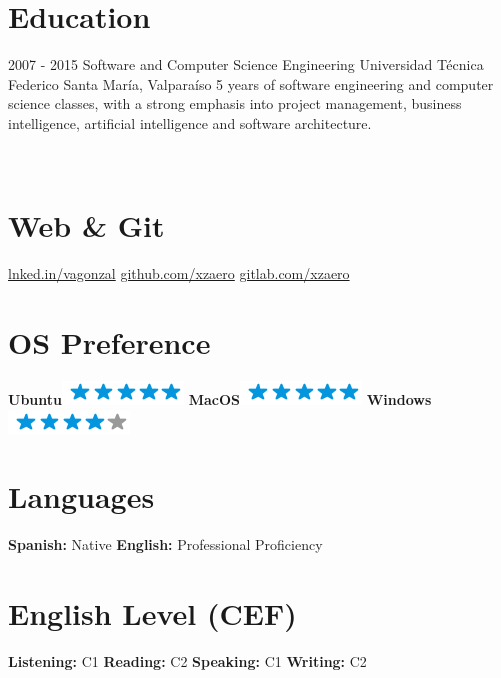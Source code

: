 \documentclass[]{friggeri-cv}
\begin{document}
\section{Education}
\begin{entrylist}
  \entry
    {2007 - 2015}
    {Software and Computer Science Engineering}
    {Universidad Técnica Federico Santa María, Valparaíso}
    {5\+ years of software engineering and computer science classes, with a strong emphasis into project management, business intelligence, artificial intelligence and software architecture.\\}
\end{entrylist}

\newpage

\begin{aside}
~
~
~
  \section{\faNewspaperO\space Web \& Git}
    \href{http://lnked.in/vagonzal}{\faLinkedin\space lnked.in/vagonzal}
    \href{https://github.com/xzaero}{\faGithub\space github.com/xzaero}
    \href{https://gitlab.com/xzaero}{\faGit\space gitlab.com/xzaero}
    ~
  \section{OS Preference}
    \textbf{Ubuntu}\includegraphics[scale=0.40]{img/5stars.png}
    \textbf{MacOS}\includegraphics[scale=0.40]{img/5stars.png}
    \textbf{Windows}\includegraphics[scale=0.40]{img/4stars.png}
    ~
  \section{Languages}
    \textbf{Spanish:} Native
    \textbf{English:} Professional Proficiency
    ~
  \section{English Level (CEF)}
    \textbf{Listening:} C1
    \textbf{Reading:} C2
	\textbf{Speaking:} C1
	\textbf{Writing:} C2
    ~
\end{aside}
\end{document}
